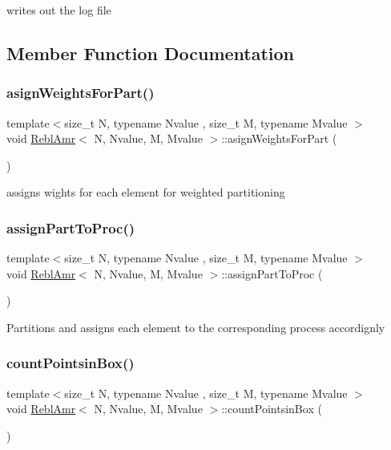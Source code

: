 writes out the log file 

\subsection{Member Function Documentation}
\mbox{\label{classReblAmr_a1d870bec577ca1e6a0a649a820984fee}} 
\subsubsection{\texorpdfstring{asign\+Weights\+For\+Part()}{asignWeightsForPart()}}
{\footnotesize\ttfamily template$<$size\+\_\+t N, typename Nvalue , size\+\_\+t M, typename Mvalue $>$ \\
void \mbox{\hyperlink{classReblAmr}{Rebl\+Amr}}$<$ N, Nvalue, M, Mvalue $>$\+::asign\+Weights\+For\+Part (\begin{DoxyParamCaption}{ }\end{DoxyParamCaption})}

assigns wights for each element for weighted partitioning \mbox{\label{classReblAmr_a5669456094f8fe106dd52af705ca9697}} 
\subsubsection{\texorpdfstring{assign\+Part\+To\+Proc()}{assignPartToProc()}}
{\footnotesize\ttfamily template$<$size\+\_\+t N, typename Nvalue , size\+\_\+t M, typename Mvalue $>$ \\
void \mbox{\hyperlink{classReblAmr}{Rebl\+Amr}}$<$ N, Nvalue, M, Mvalue $>$\+::assign\+Part\+To\+Proc (\begin{DoxyParamCaption}{ }\end{DoxyParamCaption})}

Partitions and assigns each element to the corresponding process accordignly \mbox{\label{classReblAmr_ace3c175fbab25b21c8a7174a7d90b16c}} 
\subsubsection{\texorpdfstring{count\+Pointsin\+Box()}{countPointsinBox()}}
{\footnotesize\ttfamily template$<$size\+\_\+t N, typename Nvalue , size\+\_\+t M, typename Mvalue $>$ \\
void \mbox{\hyperlink{classReblAmr}{Rebl\+Amr}}$<$ N, Nvalue, M, Mvalue $>$\+::count\+Pointsin\+Box (\begin{DoxyParamCaption}{ }\end{DoxyParamCaption})}

